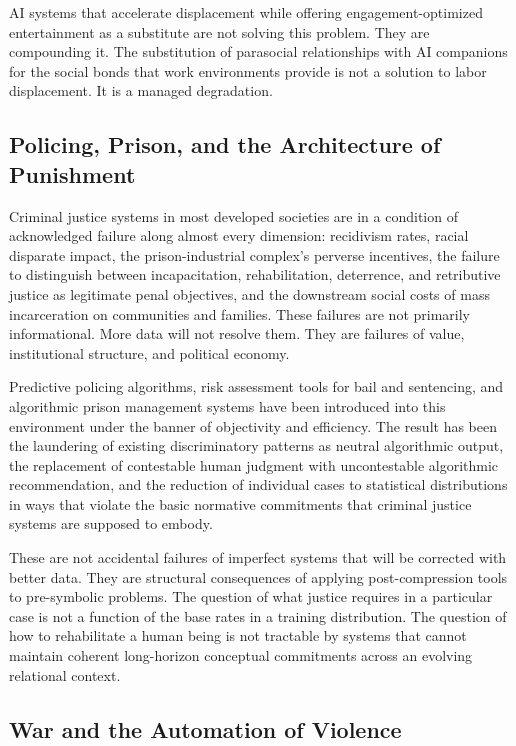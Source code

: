 \documentclass[12pt, a4paper]{article}
\theoremstyle{remark}
\begin{document}
AI systems that accelerate displacement while offering engagement-optimized entertainment as a substitute are not solving this problem. They are compounding it. The substitution of parasocial relationships with AI companions for the social bonds that work environments provide is not a solution to labor displacement. It is a managed degradation.

\subsection{Policing, Prison, and the Architecture of Punishment}

Criminal justice systems in most developed societies are in a condition of acknowledged failure along almost every dimension: recidivism rates, racial disparate impact, the prison-industrial complex's perverse incentives, the failure to distinguish between incapacitation, rehabilitation, deterrence, and retributive justice as legitimate penal objectives, and the downstream social costs of mass incarceration on communities and families. These failures are not primarily informational. More data will not resolve them. They are failures of value, institutional structure, and political economy.

Predictive policing algorithms, risk assessment tools for bail and sentencing, and algorithmic prison management systems have been introduced into this environment under the banner of objectivity and efficiency. The result has been the laundering of existing discriminatory patterns as neutral algorithmic output, the replacement of contestable human judgment with uncontestable algorithmic recommendation, and the reduction of individual cases to statistical distributions in ways that violate the basic normative commitments that criminal justice systems are supposed to embody.

These are not accidental failures of imperfect systems that will be corrected with better data. They are structural consequences of applying post-compression tools to pre-symbolic problems. The question of what justice requires in a particular case is not a function of the base rates in a training distribution. The question of how to rehabilitate a human being is not tractable by systems that cannot maintain coherent long-horizon conceptual commitments across an evolving relational context.

\subsection{War and the Automation of Violence}
\end{document}
